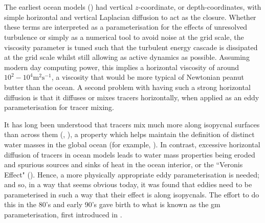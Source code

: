 \documentclass[12pt,a4paper]{report}
\begin{document}
 \section{\cite{gent1990}}
 
 The earliest ocean models (\cite{bryan1969numerical}) had vertical $z$-coordinate, or depth-coordinates, with simple horizontal and vertical Laplacian diffusion to act as 
 the closure. Whether these terms are interpreted as a parameterisation for the effects
 of unresolved turbulence or simply as a numerical tool to avoid noise at 
 the grid scale, the viscosity parameter is tuned such that the turbulent energy cascade is 
 dissipated at the grid scale whilst still allowing as active dynamics as possible. 
 Assuming modern day computing power, this implies a horizontal viscosity of around 
 $10^{2} - 10^{4} \mathrm{m^{2}s^{-1}} $, a viscosity that would be more typical of 
 Newtonian peanut butter than 
 the ocean. A second problem with having such a strong horizontal diffusion is
 that it diffuses or mixes tracers horizontally, when applied as
 an eddy parameterisation for tracer mixing. 
 
 It has long been understood that tracers 
 mix much more along isopycnal surfaces than across them (\cite{iselin1939influence}, \cite{montgomery1940present}),  a property which helps maintain the definition of
 distinct water masses in the global ocean (for example, \cite{emery1986global}).
  In contrast, excessive horizontal diffusion
 of tracers in ocean models leads to water mass properties
 being eroded and spurious sources and sinks of heat in the 
 ocean interior, or the ``Veronis Effect" (\cite{veronis1975role}).
 Hence, a more physically appropriate eddy parameterisation 
 is needed;
  and so, in a way that seems obvious today, it was found that eddies need to be
   parameterised in 
 such a way that their effect is along isopycnals. 
 The effort to do this in the 80's and early 90's gave birth
 to what is known as the \gls{gm} parameterisation, first introduced in \cite{gent1990}.
 
\end{document}
